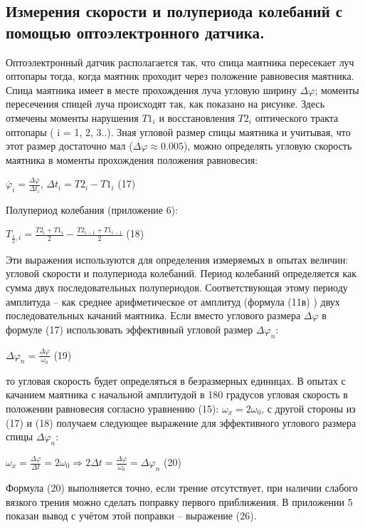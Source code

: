 \documentclass[a4paper]{article}
\begin{document}
\subsection{Измерения скорости и полупериода колебаний с помощью оптоэлектронного датчика.}
Оптоэлектронный датчик располагается так, что спица маятника пересекает луч оптопары тогда, когда маятник проходит через положение
равновесия маятника. Спица маятника имеет в месте прохождения луча угловую ширину $\Delta\varphi$; моменты пересечения спицей луча происходят
так, как показано на рисунке. Здесь отмечены моменты нарушения $T1_i$
и восстановления $T2_i$ оптического тракта оптопары ( i = 1, 2, 3..).
Зная угловой размер спицы маятника и учитывая, что этот размер
достаточно мал ($\Delta\varphi \approx 0.005$), можно определять угловую скорость
маятника в моменты прохождения положения равновесия:
\begin{center}$\dot{\varphi_i}=\frac{\Delta \varphi}{\Delta t_i}$, \space $\Delta t_i=T2_i-T1_i$ (17)\end{center}
Полупериод колебания (приложение 6):
\begin{center}$T_{\frac{1}{2}, i} = \frac{T2_i+T1_i}{2}-\frac{T2_{i-1}+T1_{i-1}}{2}$ (18)\end{center}
Эти выражения используются для определения измеряемых в опытах
величин: угловой скорости и полупериода колебаний. Период колебаний
определяется как сумма двух последовательных полупериодов. Соответствующая этому периоду амплитуда – как среднее арифметическое от амплитуд (формула (11в) ) двух последовательных качаний маятника. Если вместо углового размера $\Delta\varphi$ в формуле (17) использовать эффективный угловой размер $\Delta\varphi_n$:
\begin{center}$\Delta\varphi_n=\frac{\Delta\varphi}{\omega_0}$ (19)\end{center}
то угловая скорость будет определяться в безразмерных единицах. В опытах с качанием маятника с начальной амплитудой в 180 градусов угловая скорость в положении равновесия согласно уравнению (15): $\omega_x=2\omega_0$, с другой стороны из (17) и (18) получаем следующее выражение для эффективного углового размера спицы $\Delta\varphi_n$:
\begin{center}$\omega_x=\frac{\Delta\varphi}{\Delta t}=2\omega_0 \Rightarrow 2\Delta t =\frac{\Delta \varphi}{\omega_0}=\Delta \varphi_n$ (20)\end{center}
Формула (20) выполняется точно, если трение отсутствует, при наличии
слабого вязкого трения можно сделать поправку первого приближения.
В приложении 5 показан вывод с учётом этой поправки – выражение
(26).
\end{document}
